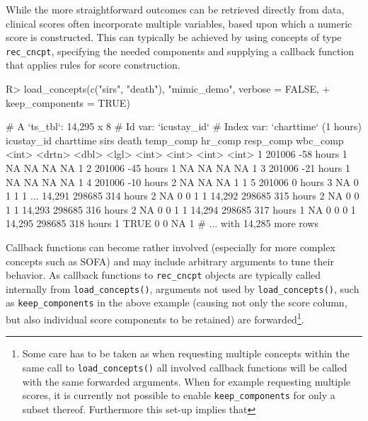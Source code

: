 \documentclass[
]{jss}
\begin{document}
While the more straightforward outcomes can be retrieved directly from
data, clinical scores often incorporate multiple variables, based upon
which a numeric score is constructed. This can typically be achieved by
using concepts of type \texttt{rec\_cncpt}, specifying the needed
components and supplying a callback function that applies rules for
score construction.

\begin{CodeChunk}
\begin{CodeInput}
R> load_concepts(c("sirs", "death"), "mimic_demo", verbose = FALSE,
+               keep_components = TRUE)
\end{CodeInput}
\begin{CodeOutput}
# A `ts_tbl`: 14,295 x 8
# Id var:     `icustay_id`
# Index var:  `charttime` (1 hours)
       icustay_id charttime  sirs death temp_comp hr_comp resp_comp wbc_comp
            <int> <drtn>    <dbl> <lgl>     <int>   <int>     <int>    <int>
     1     201006 -58 hours     1 NA           NA      NA        NA        1
     2     201006 -45 hours     1 NA           NA      NA        NA        1
     3     201006 -21 hours     1 NA           NA      NA        NA        1
     4     201006 -10 hours     2 NA           NA      NA         1        1
     5     201006   0 hours     3 NA            0       1         1        1
   ...
14,291     298685 314 hours     2 NA            0       0         1        1
14,292     298685 315 hours     2 NA            0       0         1        1
14,293     298685 316 hours     2 NA            0       0         1        1
14,294     298685 317 hours     1 NA            0       0         0        1
14,295     298685 318 hours     1 TRUE          0       0        NA        1
# ... with 14,285 more rows
\end{CodeOutput}
\end{CodeChunk}

Callback functions can become rather involved (especially for more
complex concepts such as SOFA) and may include arbitrary arguments to
tune their behavior. As callback functions to \texttt{rec\_cncpt}
objects are typically called internally from \texttt{load\_concepts()},
arguments not used by \texttt{load\_concepts()}, such as
\texttt{keep\_components} in the above example (causing not only the
score column, but also individual score components to be retained) are
forwarded\footnote{Some care has to be taken as when requesting multiple
  concepts within the same call to \texttt{load\_concepts()} all
  involved callback functions will be called with the same forwarded
  arguments. When for example requesting multiple scores, it is
  currently not possible to enable \texttt{keep\_components} for only a
  subset thereof. Furthermore this set-up implies that }.
\end{document}
